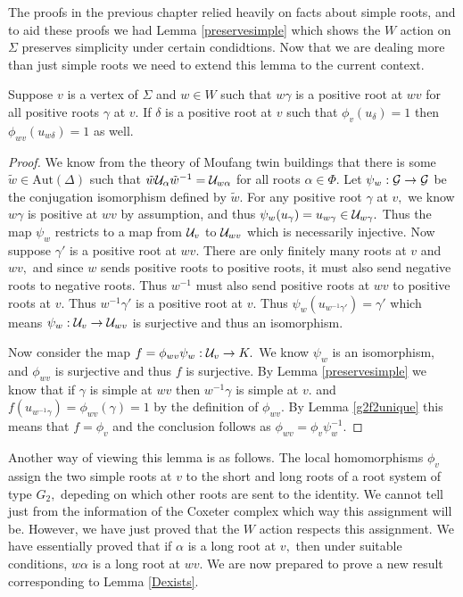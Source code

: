 \documentclass[class=book, crop=false]{standalone}
\begin{document}
The proofs in the previous chapter relied heavily on facts about simple roots, and to aid these proofs we had Lemma \ref{preservesimple} which shows the $W$ action on $\Sigma$ preserves simplicity under certain condidtions. Now that we are dealing more than just simple roots we need to extend this lemma to the current context.

\begin{lemma}
	\label{preservemapto1}
	Suppose $v$ is a vertex of $\Sigma$ and $w\in W$ such that $w\gamma$ is a positive root at $wv$ for all positive roots $\gamma$ at $v.$ If $\delta$ is a positive root at $v$ such that $\phi_v(u_\delta)=1$ then $\phi_{wv}(u_{w\delta})=1$ as well.
\end{lemma}
\begin{proof}
	We know from the theory of Moufang twin buildings that there is some $\tilde{w}\in \mathrm{Aut}(\Delta)$ such that $\tilde{w}\mathcal{U}_\alpha\tilde{w}^{-1}=\mathcal{U}_{w\alpha}$ for all roots $\alpha\in \Phi.$ Let $\psi_w:\mathcal{G}\to \mathcal{G}$ be the conjugation isomorphism defined by $\tilde{w}.$ For any positive root $\gamma$ at $v,$ we know $w\gamma$ is positive at $wv$ by assumption, and thus $\psi_w(u_\gamma)=u_{w\gamma}\in \mathcal{U}_{w\gamma}.$ Thus the map $\psi_w$ restricts to a map from $\mathcal{U}_v$ to $\mathcal{U}_{wv}$ which is necessarily injective. Now suppose $\gamma'$ is a positive root at $wv.$ There are only finitely many roots at $v$ and $wv,$ and since $w$ sends positive roots to positive roots, it must also send negative roots to negative roots. Thus $w^{-1}$ must also send positive roots at $wv$ to positive roots at $v.$ Thus $w^{-1}\gamma'$ is a positive root at $v.$ Thus $\psi_w(u_{w^{-1}\gamma'})=\gamma'$ which means $\psi_w:\mathcal{U}_v\to \mathcal{U}_{wv}$ is surjective and thus an isomorphism.

	Now consider the map $f=\phi_{wv}\psi_w:\mathcal{U}_v\to K.$ We know $\psi_w$ is an isomorphism, and $\phi_{wv}$ is surjective and thus $f$ is surjective. By Lemma \ref{preservesimple} we know that if $\gamma$ is simple at $wv$ then $w^{-1}\gamma$ is simple at $v.$ and $f(u_{w^{-1}\gamma})=\phi_{wv}(\gamma)=1$ by the definition of $\phi_{wv}.$ By Lemma \ref{g2f2unique} this means that $f=\phi_v$ and the conclusion follows as $\phi_{wv}=\phi_v \psi_w^{-1}.$
\end{proof}

Another way of viewing this lemma is as follows. The local homomorphisms $\phi_v$ assign the two simple roots at $v$ to the short and long roots of a root system of type $G_2,$ depeding on which other roots are sent to the identity. We cannot tell just from the information of the Coxeter complex which way this assignment will be. However, we have just proved that the $W$ action respects this assignment. We have essentially proved that if $\alpha$ is a long root at $v,$ then under suitable conditions, $w\alpha$ is a long root at $wv.$ We are now prepared to prove a new result corresponding to Lemma \ref{Dexists}.
\end{document}
